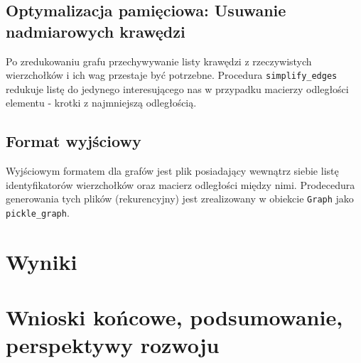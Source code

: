 \documentclass[a4paper,10pt]{article}
\begin{document}
\subsection{Optymalizacja pamięciowa: Usuwanie nadmiarowych krawędzi}

Po zredukowaniu grafu przechywywanie listy krawędzi z rzeczywistych wierzchołków i ich wag przestaje być potrzebne. Procedura \texttt{simplify\_edges} redukuje listę do jedynego interesującego nas w przypadku macierzy odległości elementu - krotki z najmniejszą odległością.

\subsection{Format wyjściowy}

Wyjściowym formatem dla grafów jest plik posiadający wewnątrz siebie listę identyfikatorów wierzchołków oraz macierz odległości między nimi. Prodecedura generowania tych plików (rekurencyjny) jest zrealizowany w obiekcie \texttt{Graph} jako \texttt{pickle\_graph}.

\section{Wyniki}
\section{Wnioski końcowe, podsumowanie, perspektywy rozwoju}
\end{document}
